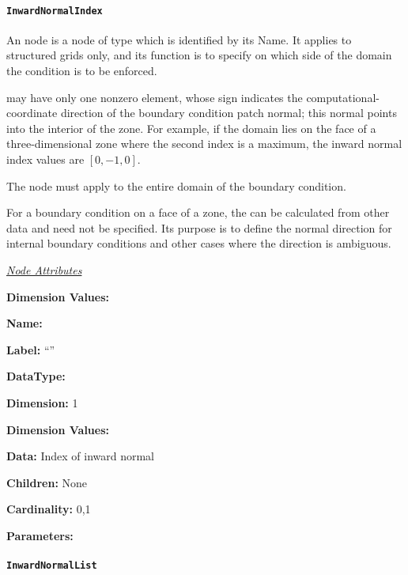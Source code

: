 \paragraph{\texttt{InwardNormalIndex}}

An  node is a node of type
 which is identified by its Name.
It applies to structured grids only, and its function is to specify on
which side of the domain the condition is to be enforced.

 may have only one nonzero element, whose
sign indicates the computational-coordinate direction of the boundary
condition patch normal; this normal points into the interior of the zone.
For example, if the domain lies on the face of a three-dimensional zone
where the second index is a maximum, the inward normal index values are
$[0,-1,0]$.

The  node must apply to the entire domain
of the boundary condition.

For a boundary condition on a face of a zone, the
 can be calculated from other data and need not
be specified. Its purpose is to define the normal direction for internal
boundary conditions and other cases where the direction is ambiguous.

\textit{\uline{Node Attributes}}
\begin{Ventryic}{\textbf{Dimension Values:}}
\item [\textbf{Name:}]
\item [\textbf{Label:}]
      ``''
\item [\textbf{DataType:}]
\item [\textbf{Dimension:}]
      1
\item [\textbf{Dimension Values:}]
\item [\textbf{Data:}]
      Index of inward normal
\item [\textbf{Children:}]
      None
\item [\textbf{Cardinality:}]
      0,1
\item [\textbf{Parameters:}]
\end{Ventryic}

\paragraph{\texttt{InwardNormalList}}

